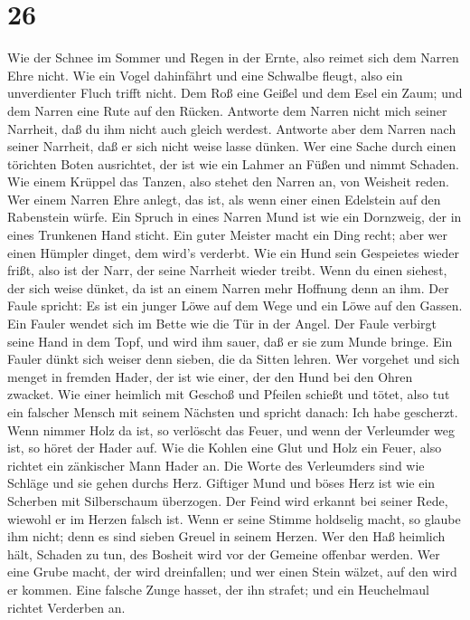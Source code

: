 \hypertarget{section-25}{%
\section{26}\label{section-25}}

 Wie der Schnee im Sommer und Regen in der Ernte, also
reimet sich dem Narren Ehre nicht.  Wie ein Vogel dahinfährt
und eine Schwalbe fleugt, also ein unverdienter Fluch trifft nicht.
 Dem Roß eine Geißel und dem Esel ein Zaum; und dem Narren
eine Rute auf den Rücken.  Antworte dem Narren nicht mich
seiner Narrheit, daß du ihm nicht auch gleich werdest. 
Antworte aber dem Narren nach seiner Narrheit, daß er sich nicht weise
lasse dünken.  Wer eine Sache durch einen törichten Boten
ausrichtet, der ist wie ein Lahmer an Füßen und nimmt Schaden.
 Wie einem Krüppel das Tanzen, also stehet den Narren an,
von Weisheit reden.  Wer einem Narren Ehre anlegt, das ist,
als wenn einer einen Edelstein auf den Rabenstein würfe. 
Ein Spruch in eines Narren Mund ist wie ein Dornzweig, der in eines
Trunkenen Hand sticht.  Ein guter Meister macht ein Ding
recht; aber wer einen Hümpler dinget, dem wird's verderbt. 
Wie ein Hund sein Gespeietes wieder frißt, also ist der Narr, der seine
Narrheit wieder treibt.  Wenn du einen siehest, der sich
weise dünket, da ist an einem Narren mehr Hoffnung denn an ihm.
 Der Faule spricht: Es ist ein junger Löwe auf dem Wege und
ein Löwe auf den Gassen.  Ein Fauler wendet sich im Bette
wie die Tür in der Angel.  Der Faule verbirgt seine Hand in
dem Topf, und wird ihm sauer, daß er sie zum Munde bringe. 
Ein Fauler dünkt sich weiser denn sieben, die da Sitten lehren.
 Wer vorgehet und sich menget in fremden Hader, der ist wie
einer, der den Hund bei den Ohren zwacket.  Wie einer
heimlich mit Geschoß und Pfeilen schießt und tötet,  also
tut ein falscher Mensch mit seinem Nächsten und spricht danach: Ich habe
gescherzt.  Wenn nimmer Holz da ist, so verlöscht das
Feuer, und wenn der Verleumder weg ist, so höret der Hader auf.
 Wie die Kohlen eine Glut und Holz ein Feuer, also richtet
ein zänkischer Mann Hader an.  Die Worte des Verleumders
sind wie Schläge und sie gehen durchs Herz.  Giftiger Mund
und böses Herz ist wie ein Scherben mit Silberschaum überzogen.
 Der Feind wird erkannt bei seiner Rede, wiewohl er im
Herzen falsch ist.  Wenn er seine Stimme holdselig macht,
so glaube ihm nicht; denn es sind sieben Greuel in seinem Herzen.
 Wer den Haß heimlich hält, Schaden zu tun, des Bosheit
wird vor der Gemeine offenbar werden.  Wer eine Grube
macht, der wird dreinfallen; und wer einen Stein wälzet, auf den wird er
kommen.  Eine falsche Zunge hasset, der ihn strafet; und
ein Heuchelmaul richtet Verderben an.

